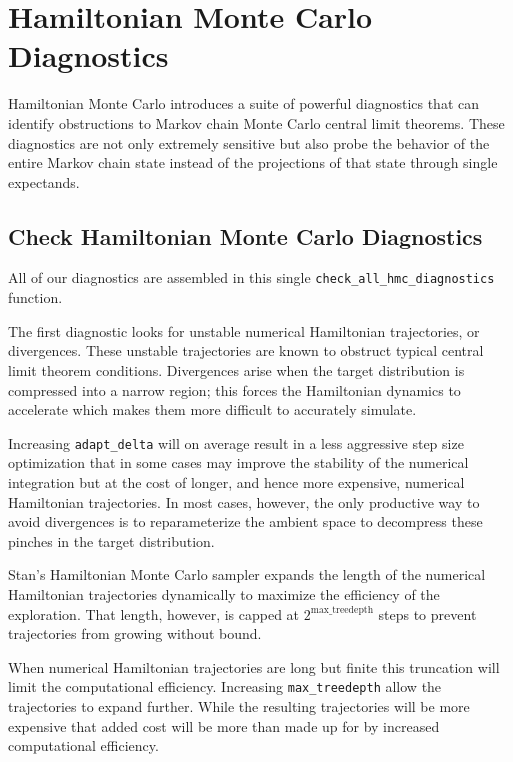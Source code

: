 \documentclass[
  letterpaper,
  DIV=11,
  numbers=noendperiod]{scrartcl}
\begin{document}
\hypertarget{hamiltonian-monte-carlo-diagnostics}{%
\section{Hamiltonian Monte Carlo
Diagnostics}\label{hamiltonian-monte-carlo-diagnostics}}

Hamiltonian Monte Carlo introduces a suite of powerful diagnostics that
can identify obstructions to Markov chain Monte Carlo central limit
theorems. These diagnostics are not only extremely sensitive but also
probe the behavior of the entire Markov chain state instead of the
projections of that state through single expectands.

\hypertarget{check-hamiltonian-monte-carlo-diagnostics}{%
\subsection{Check Hamiltonian Monte Carlo
Diagnostics}\label{check-hamiltonian-monte-carlo-diagnostics}}

All of our diagnostics are assembled in this single
\texttt{check\_all\_hmc\_diagnostics} function.

The first diagnostic looks for unstable numerical Hamiltonian
trajectories, or divergences. These unstable trajectories are known to
obstruct typical central limit theorem conditions. Divergences arise
when the target distribution is compressed into a narrow region; this
forces the Hamiltonian dynamics to accelerate which makes them more
difficult to accurately simulate.

Increasing \texttt{adapt\_delta} will on average result in a less
aggressive step size optimization that in some cases may improve the
stability of the numerical integration but at the cost of longer, and
hence more expensive, numerical Hamiltonian trajectories. In most cases,
however, the only productive way to avoid divergences is to
reparameterize the ambient space to decompress these pinches in the
target distribution.

Stan's Hamiltonian Monte Carlo sampler expands the length of the
numerical Hamiltonian trajectories dynamically to maximize the
efficiency of the exploration. That length, however, is capped at
\(2^{\text{max\_treedepth}}\) steps to prevent trajectories from growing
without bound.

When numerical Hamiltonian trajectories are long but finite this
truncation will limit the computational efficiency. Increasing
\texttt{max\_treedepth} allow the trajectories to expand further. While
the resulting trajectories will be more expensive that added cost will
be more than made up for by increased computational efficiency.
\end{document}
